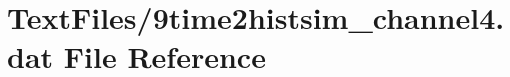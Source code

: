 \hypertarget{9time2histsim__channel4_8dat}{}\section{Text\+Files/9time2histsim\+\_\+channel4.dat File Reference}
\label{9time2histsim__channel4_8dat}
